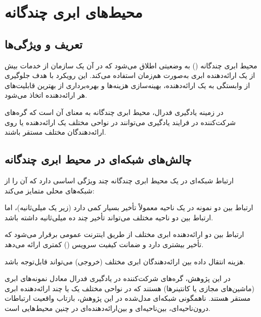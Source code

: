 \section{محیط‌های ابری چندگانه}
\label{sec:cloud_concepts}

\subsection{تعریف و ویژگی‌ها}

\begin{ntdefinition}
محیط ابری چندگانه () به وضعیتی اطلاق می‌شود که در آن یک سازمان از خدمات بیش از یک ارائه‌دهنده ابری به‌صورت هم‌زمان استفاده می‌کند. این رویکرد با هدف جلوگیری از وابستگی به یک ارائه‌دهنده، بهینه‌سازی هزینه‌ها و بهره‌برداری از بهترین قابلیت‌های هر ارائه‌دهنده اتخاذ می‌شود.
\end{ntdefinition}

در زمینه یادگیری فدرال، محیط ابری چندگانه به معنای آن است که گره‌های شرکت‌کننده در فرایند یادگیری می‌توانند در نواحی مختلف یک ارائه‌دهنده یا روی ارائه‌دهندگان مختلف مستقر باشند.

\subsection{چالش‌های شبکه‌ای در محیط ابری چندگانه}

ارتباط شبکه‌ای در یک محیط ابری چندگانه چند ویژگی اساسی دارد که آن را از شبکه‌های محلی متمایز می‌کند:

\begin{itemize}
    \tick ارتباط بین دو نمونه در یک ناحیه معمولاً تأخیر بسیار کمی دارد (زیر یک میلی‌ثانیه)، اما ارتباط بین دو ناحیه مختلف می‌تواند تأخیر چند ده میلی‌ثانیه داشته باشد.
    
    \tick ارتباط بین دو ارائه‌دهنده ابری مختلف از طریق اینترنت عمومی برقرار می‌شود که تأخیر بیشتری دارد و ضمانت کیفیت سرویس () کمتری ارائه می‌دهد.
    
    \tick هزینه انتقال داده بین ارائه‌دهندگان ابری مختلف (خروجی) می‌تواند قابل‌توجه باشد.
\end{itemize}

\begin{info}
    در این پژوهش، گره‌های شرکت‌کننده در یادگیری فدرال معادل نمونه‌های ابری (ماشین‌های مجازی یا کانتینرها) هستند که در نواحی مختلف یک یا چند ارائه‌دهنده ابری مستقر هستند. ناهمگونی شبکه‌ای مدل‌شده در این پژوهش، بازتاب واقعیت ارتباطات درون‌ناحیه‌ای، بین‌ناحیه‌ای و بین‌ارائه‌دهنده‌ای در چنین محیط‌هایی است.
\end{info}


